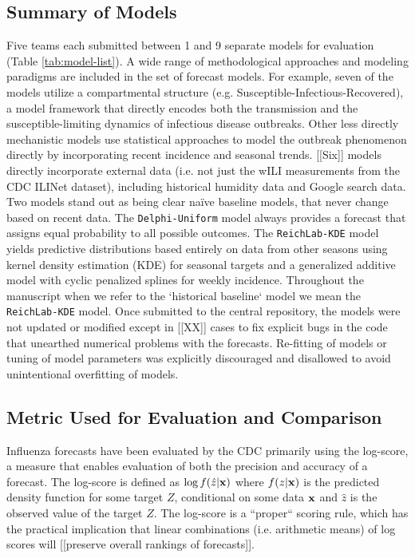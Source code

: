 \documentclass{article}
\begin{document}
\subsection{Summary of Models}

Five teams each submitted between 1 and 9 separate models for evaluation (Table \ref{tab:model-list}). 
A wide range of methodological approaches and modeling paradigms are included in the set of forecast models.
For example, seven of the models utilize a compartmental structure (e.g. Susceptible-Infectious-Recovered), a model framework that directly encodes both the transmission and the susceptible-limiting dynamics of infectious disease outbreaks.
Other less directly mechanistic models use statistical approaches to model the outbreak phenomenon directly by incorporating recent incidence and seasonal trends.
[[Six]] models directly incorporate external data (i.e. not just the wILI measurements from the CDC ILINet dataset), including historical humidity data and Google search data.
Two models stand out as being clear na\"ive baseline models, that never change based on recent data. 
The {\tt Delphi-Uniform} model always provides a forecast that assigns equal probability to all possible outcomes. 
The {\tt ReichLab-KDE} model yields predictive distributions based entirely on data from other seasons using kernel density estimation (KDE) for seasonal targets and a generalized additive model with cyclic penalized splines for weekly incidence.
Throughout the manuscript when we refer to the `historical baseline` model we mean the {\tt ReichLab-KDE} model.
Once submitted to the central repository, the models were not updated or modified except in [[XX]] cases to fix explicit bugs in the code that unearthed numerical problems with the forecasts. 
Re-fitting of models or tuning of model parameters was explicitly discouraged and disallowed to avoid unintentional overfitting of models.



\subsection{Metric Used for Evaluation and Comparison}

Influenza forecasts have been evaluated by the CDC primarily using the log-score, a measure that enables evaluation of both the precision and accuracy of a forecast.\cite{Gneiting2007} 
The log-score is defined as $\log f(\hat z|\bf{x})$ where $f(z|\bf{x})$ is the predicted density function for some target $Z$, conditional on some data $\bf{x}$ and $\hat z$ is the observed value of the target $Z$. 
The log-score is a ``proper`` scoring rule, which has the practical implication that linear combinations (i.e. arithmetic means) of log scores will [[preserve overall rankings of forecasts]].
\end{document}
